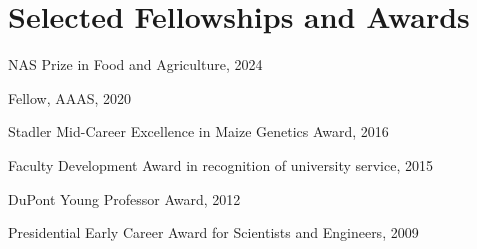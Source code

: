 \documentclass[letterpaper,10pt]{article}
\renewenvironment{itemize}{
  \begin{list}{}{
    \setlength{\leftmargin}{1.5em}
  }
}{
  \end{list}
}
\begin{document}
\section*{Selected Fellowships and Awards}
\setlength\itemsep{0ex}
\begin {itemize}
\setlength\itemsep{0ex}
\item NAS Prize in Food and Agriculture, 2024
\item Fellow, AAAS, 2020
\item Stadler Mid-Career Excellence in Maize Genetics Award, 2016
\item Faculty Development Award in recognition of university service, 2015
\item DuPont Young Professor Award, 2012
\item Presidential Early Career Award for Scientists and Engineers, 2009
\end{itemize}
\end{document}
